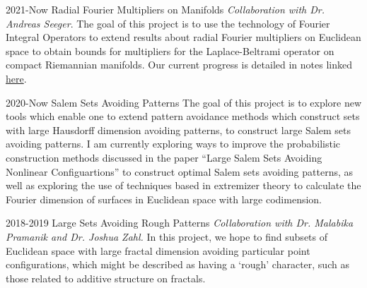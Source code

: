 \documentclass[a4paper]{cv-friggeri}
\begin{document}
\begin{entrylist}

\entry
{2021-Now}
{Radial Fourier Multipliers on Manifolds}
{}
{\emph{Collaboration with Dr. Andreas Seeger}. The goal of this project is to use the technology of Fourier Integral Operators to extend results about radial Fourier multipliers on Euclidean space to obtain bounds for multipliers for the Laplace-Beltrami operator on compact Riemannian manifolds. Our current progress is detailed in notes linked \href{https://github.com/jdjake/Notes/blob/master/Research/FourierIntegralOperators/RadialMultipliers.pdf}{here}.}



\entry
{2020-Now}
{Salem Sets Avoiding Patterns}
{}
{The goal of this project is to explore new tools which enable one to extend pattern avoidance methods which construct sets with large Hausdorff dimension avoiding patterns, to construct large Salem sets avoiding patterns. I am currently exploring ways to improve the probabilistic construction methods discussed in the paper ``Large Salem Sets Avoiding Nonlinear Configuartions'' to construct optimal Salem sets avoiding patterns, as well as exploring the use of techniques based in extremizer theory to calculate the Fourier dimension of surfaces in Euclidean space with large codimension.}


\entry
{2018-2019}
{Large Sets Avoiding Rough Patterns}
{}
{\emph{Collaboration with Dr. Malabika Pramanik and Dr. Joshua Zahl.} In this project, we hope to find subsets of Euclidean space with large fractal dimension avoiding particular point configurations, which might be described as having a `rough' character, such as those related to additive structure on fractals.}





\end{entrylist}
\end{document}
